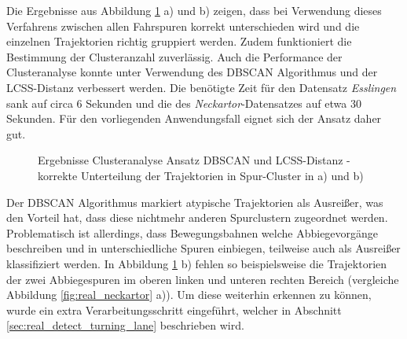 Die Ergebnisse aus Abbildung \ref{fig:real_results_dbscan_lcss} a) und b) zeigen, dass bei Verwendung
dieses Verfahrens zwischen allen Fahrspuren korrekt unterschieden wird und die einzelnen Trajektorien
richtig gruppiert werden. Zudem funktioniert die Bestimmung der Clusteranzahl zuverlässig.
Auch die Performance der Clusteranalyse konnte unter Verwendung des DBSCAN Algorithmus und der LCSS-Distanz
verbessert werden. Die benötigte Zeit für den Datensatz \textit{Esslingen} sank auf circa 6 Sekunden und die des
\textit{Neckartor}-Datensatzes auf etwa 30 Sekunden. Für den vorliegenden Anwendungsfall eignet sich der Ansatz daher
gut.

\begin{figure}[H]
    \centering
    \qquad \qquad
    \caption[Ergebnisse Clusteranalyse Ansatz DBSCAN und LCSS-Distanz]
            {Ergebnisse Clusteranalyse Ansatz DBSCAN und LCSS-Distanz - korrekte Unterteilung der Trajektorien in Spur-Cluster in a) und b)}
    \label{fig:real_results_dbscan_lcss}
\end{figure}

Der DBSCAN Algorithmus markiert atypische Trajektorien als Ausreißer, was den Vorteil hat, dass
diese nichtmehr anderen Spurclustern zugeordnet werden. Problematisch ist allerdings, dass Bewegungsbahnen
welche Abbiegevorgänge beschreiben und in unterschiedliche Spuren einbiegen, teilweise auch als Ausreißer
klassifiziert werden. In Abbildung \ref{fig:real_results_dbscan_lcss} b) fehlen so beispielsweise die Trajektorien
der zwei Abbiegespuren im oberen linken und unteren rechten Bereich (vergleiche Abbildung \ref{fig:real_neckartor} a)).
Um diese weiterhin erkennen zu können, wurde ein extra Verarbeitungsschritt eingeführt, welcher in Abschnitt
\ref{sec:real_detect_turning_lane} beschrieben wird.

